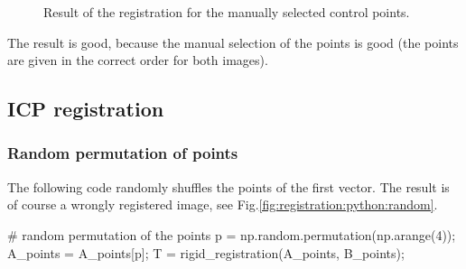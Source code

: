 \begin{figure}[htbp]
\centering\caption{Result of the registration for the manually selected control points.}%
 \hspace*{1.5cm}
 \label{fig:registration:python:reg}%
\end{figure}

The result is good, because the manual selection of the points is good (the points are given in the correct order for both images).


\subsection{ICP registration}

\subsubsection{Random permutation of points}
The following code randomly shuffles the points of the first vector. The result is of course a wrongly registered image, see Fig.\ref{fig:registration:python:random}. 

\begin{python}
# random permutation of the points
p = np.random.permutation(np.arange(4));
A_points = A_points[p];
T = rigid_registration(A_points, B_points);
\end{python}

